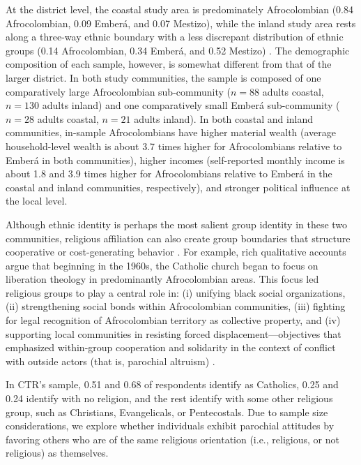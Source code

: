 \documentclass[bibauthoryear]{aa}
\begin{document}
At the district level, the coastal study area is predominately Afrocolombian (0.84 Afrocolombian, 0.09 Ember\'a, and 0.07 Mestizo), while the inland study area rests along a three-way ethnic boundary with a less discrepant distribution of ethnic groups (0.14 Afrocolombian, 0.34 Ember\'a, and 0.52 Mestizo) \citep{DAN051}. 
The demographic composition of each sample, however, is somewhat different from that of the larger district. In both study communities, the sample is composed of one comparatively large Afrocolombian sub-community ($n=88$ adults coastal, $n=130$ adults inland) and one comparatively small Ember\'a sub-community  ($n=28$ adults coastal, $n=21$ adults inland). In both coastal and inland communities, in-sample Afrocolombians have higher material wealth (average household-level wealth is about 3.7 times higher for Afrocolombians relative to Ember\'a in both communities), higher incomes (self-reported monthly income is about 1.8 and 3.9 times higher for Afrocolombians relative to Ember\'a in the coastal and inland communities, respectively), and stronger political influence at the local level. %

Although ethnic identity is perhaps the most salient group identity in these two communities, religious affiliation can also create group boundaries that  structure cooperative or cost-generating behavior  \citep[e.g.,][]{lang2019moralizing, purzycki2016moralistic, hruschka2014impartial}. For example, rich qualitative accounts \citep[e.g.,][]{oyola2015religion} argue that beginning in the 1960s,  the Catholic church began to focus on liberation theology in predominantly Afrocolombian areas. This focus led religious groups to play a central role in: (i) unifying black social organizations,  (ii) strengthening social bonds within Afrocolombian communities, (iii) fighting for legal recognition of Afrocolombian territory as collective property, and (iv) supporting local communities in resisting forced displacement---objectives that emphasized within-group cooperation and solidarity in the context of conflict with outside actors (that is, parochial altruism) \citep{oyola2017local}.

In CTR's sample, 0.51 and 0.68 of respondents identify as Catholics, 0.25 and 0.24 identify with no religion, and the rest identify with some other religious group, such as Christians, Evangelicals, or Pentecostals. Due to sample size considerations, we explore whether individuals exhibit parochial attitudes by favoring others who are of the same religious orientation (i.e., religious, or not religious) as themselves.
\end{document}
